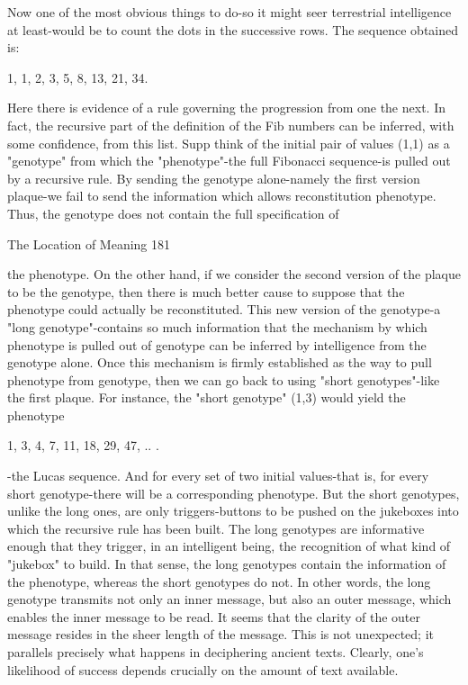          Now one of the most obvious things to do-so it might seer terrestrial intelligence
at least-would be to count the dots in the successive rows. The sequence obtained is:

                            1, 1, 2, 3, 5, 8, 13, 21, 34.


Here there is evidence of a rule governing the progression from one the next. In fact, the
recursive part of the definition of the Fib numbers can be inferred, with some confidence,
from this list. Supp think of the initial pair of values (1,1) as a "genotype" from which the
"phenotype"-the full Fibonacci sequence-is pulled out by a recursive rule. By sending the
genotype alone-namely the first version plaque-we fail to send the information which
allows reconstitution phenotype. Thus, the genotype does not contain the full
specification of



The Location of Meaning                                                                  181

the phenotype. On the other hand, if we consider the second version of the plaque to be
the genotype, then there is much better cause to suppose that the phenotype could
actually be reconstituted. This new version of the genotype-a "long genotype"-contains so
much information that the mechanism by which phenotype is pulled out of genotype can
be inferred by intelligence from the genotype alone.
        Once this mechanism is firmly established as the way to pull phenotype from
genotype, then we can go back to using "short genotypes"-like the first plaque. For
instance, the "short genotype" (1,3) would yield the phenotype

                1,      3,     4,      7,      11,     18,     29,     47, .. .

-the Lucas sequence. And for every set of two initial values-that is, for every short
genotype-there will be a corresponding phenotype. But the short genotypes, unlike the
long ones, are only triggers-buttons to be pushed on the jukeboxes into which the
recursive rule has been built. The long genotypes are informative enough that they
trigger, in an intelligent being, the recognition of what kind of "jukebox" to build. In that
sense, the long genotypes contain the information of the phenotype, whereas the short
genotypes do not. In other words, the long genotype transmits not only an inner message,
but also an outer message, which enables the inner message to be read. It seems that the
clarity of the outer message resides in the sheer length of the message. This is not
unexpected; it parallels precisely what happens in deciphering ancient texts. Clearly,
one's likelihood of success depends crucially on the amount of text available.

